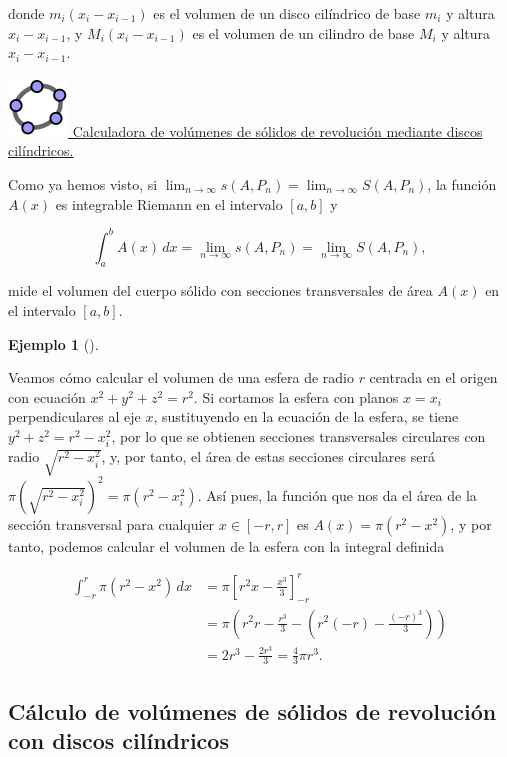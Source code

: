 \documentclass[
  a4paper,
]{scrreport}
\theoremstyle{definition}
\newtheorem{example}{Ejemplo}[chapter]
\theoremstyle{plain}
\theoremstyle{definition}
\theoremstyle{definition}
\theoremstyle{plain}
\theoremstyle{plain}
\theoremstyle{remark}
\begin{document}
donde \(m_i (x_i-x_{i-1})\) es el volumen de un disco cilíndrico de base
\(m_i\) y altura \(x_i-x_{i-1}\), y \(M_i (x_i-x_{i-1})\) es el volumen
de un cilindro de base \(M_i\) y altura \(x_i-x_{i-1}\).

\href{https://www.geogebra.org/classic/drndnm2u}{\includegraphics{img/logos/logo-geogebra.png}
Calculadora de volúmenes de sólidos de revolución mediante discos
cilíndricos.}

Como ya hemos visto, si
\(\lim_{n\to\infty} s(A,P_n) = \lim_{n\to\infty} S(A,P_n)\), la función
\(A(x)\) es integrable Riemann en el intervalo \([a,b]\) y

\[
\int_a^b A(x)\,dx = \lim_{n\to\infty} s(A,P_n) = \lim_{n\to\infty} S(A,P_n),
\]

mide el volumen del cuerpo sólido con secciones transversales de área
\(A(x)\) en el intervalo \([a,b]\).

\begin{example}[]\protect\hypertarget{exm-volumen-esfera}{}\label{exm-volumen-esfera}

Veamos cómo calcular el volumen de una esfera de radio \(r\) centrada en
el origen con ecuación \(x^2+y^2+z^2=r^2\). Si cortamos la esfera con
planos \(x=x_i\) perpendiculares al eje \(x\), sustituyendo en la
ecuación de la esfera, se tiene \(y^2+z^2=r^2-x_i^2\), por lo que se
obtienen secciones transversales circulares con radio
\(\sqrt{r^2-x_i^2}\), y, por tanto, el área de estas secciones
circulares será
\(\pi \left(\sqrt{r^2-x_i^2}\right)^2= \pi (r^2-x_i^2)\). Así pues, la
función que nos da el área de la sección transversal para cualquier
\(x\in[-r,r]\) es \(A(x)=\pi(r^2-x^2)\), y por tanto, podemos calcular
el volumen de la esfera con la integral definida

\begin{align*}
\int_{-r}^r \pi(r^2-x^2)\,dx 
&= \pi\left[r^2x-\frac{x^3}{3}\right]_{-r}^r \\
&= \pi\left(r^2r-\frac{r^3}{3}-\left(r^2(-r)-\frac{(-r)^3}{3}\right)\right) \\
&= 2r^3 - \frac{2r^3}{3} 
= \frac{4}{3}\pi r^3.
\end{align*}

\end{example}

\subsection{Cálculo de volúmenes de sólidos de revolución con discos
cilíndricos}\label{cuxe1lculo-de-voluxfamenes-de-suxf3lidos-de-revoluciuxf3n-con-discos-ciluxedndricos}
\end{document}
